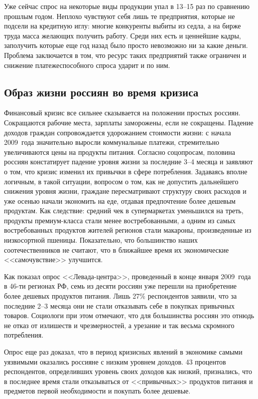   Уже сейчас спрос на некоторые виды продукции упал в 13--15 раз по сравнению
  прошлым годом. Неплохо чувствуют себя лишь те предприятия, которые не подсели
  на кредитную иглу: многие конкуренты выбиты из седла, а на бирже труда масса
  желающих получить работу. Среди них есть и ценнейшие кадры, заполучить которые
  еще год назад было просто невозможно ни за какие деньги. Проблема заключается
  в том, что ресурс таких предприятий также ограничен и снижение
  платежеспособного спроса ударит и по ним.

  \subsection{Образ жизни россиян во время кризиса}
  
  Финансовый кризис все сильнее сказывается на положении простых россиян.
  Сокращаются рабочие места, зарплаты заморожены, если не сокращены. Падение
  доходов граждан сопровождается удорожанием стоимости жизни: с начала 2009~года
  значительно выросли коммунальные платежи, стремительно увеличиваются цены на
  продукты питания. Согласно соцопросам, половина россиян констатирует падение
  уровня жизни за последние 3--4 месяца и заявляют о том, что кризис изменил их
  привычки в сфере потребления. Задаваясь вполне логичным, в такой ситуации,
  вопросом о том, как не допустить дальнейшего снижения уровня жизни, граждане
  пересматривают структуру своих расходов и уже осенью начали экономить на еде,
  отдавая предпочтение более дешевым продуктам. Как следствие: средний чек в
  супермаркетах уменьшился на треть, продукты премиум-класса стали менее
  востребованными, а одним из самых востребованных продуктов жителей регионов
  стали макароны, произведенные из низкосортной пшеницы. Показательно, что
  большинство наших соотечественников не считают, что в ближайшее время их
  экономические <<самочувствие>> улучшится.
  
  Как показал опрос <<Левада-центра>>, проведенный в конце января 2009~года в
  46-ти регионах РФ, семь из десяти россиян уже перешли на приобретение более
  дешевых продуктов питания. Лишь 27\% респондентов заявили, что за последние
  2--3 месяца они не стали отказывать себе в покупках привычных товаров.
  Социологи при этом отмечают, что для большинства россиян это отнюдь не отказ
  от излишеств и чрезмерностей, а урезание и так весьма скромного потребления.
  
  Опрос еще раз доказал, что в период кризисных явлений в экономике самыми
  уязвимыми оказались россияне с низким уровнем доходов. 43 процентов
  респондентов, определивших уровень своих доходов как низкий, признались, что в
  последнее время стали отказываться от <<привычных>> продуктов питания и
  предметов первой необходимости и покупать более дешевые.
  
